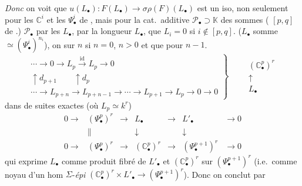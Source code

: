 \documentclass[11pt,a4paper]{article}
\begin{document}
\emph{Donc} on voit que $u(L_{\bullet}) : F(L_{\bullet}) \to \sigma\rho(F)(L_{\bullet})$
est un iso, non seulement pour les $\mathbb{C}^i$ et les $\Psi^i_{\bullet}$ de \ill{}, mais
pour  la cat.\ additive $\mathcal{P}_{\bullet} \supset \mathbb{K}$ des sommes
 (   
 \struck{\ill{}} $[p, q]$ de .) $\mathcal{P}_{\bullet}$
 par les $L_{\bullet}$, par la longueur  $L_{\bullet}$,
 que $L_i = 0$ si $i \notin [p, q]$. ($L_{\bullet}$ somme
$\simeq (\Psi^i_{\bullet})^{n_i}$), on   sur $n$ si
$n = 0$, \ill{} \ill{} $n > 0$ et  \ill{} que \ill{}  pour $n - 1$.
\[
\left.
\begin{array}{c}
\cdots \to 0 \to L_p \xrightarrow{\ \mathrm{id}\ } L_p \to 0 \\
\uparrow{\scriptstyle d_{p+1}} \qquad \uparrow{\scriptstyle d_p} \\
\cdots \to L_{p+n} \to L_{p+n-1} \to \cdots \to L_{p+1} \to L_p \to 0 \to 0
\end{array}
\right\rbrace
\qquad
\begin{array}{c}
(\mathbb{C}^{p}_{\bullet})^{r} \\
\uparrow \\
L_{\bullet}
\end{array}
\]
\ill{} dans \ill{} \ill{} de suites exactes (où $L_p \simeq k^r$)
\[
\begin{array}{ccccccccc}
0 \to & (\Psi^p_{\bullet})^r & \to & L_{\bullet} & \longrightarrow & L'_{\bullet} & \to 0 \\
& \| & & \downarrow & & \downarrow & \\
0 \to & (\Psi^p_{\bullet})^r & \to & (\mathbb{C}^p_{\bullet})^r & \longrightarrow & (\Psi^{p+1}_{\bullet})^r & \to 0
\end{array}
\]
qui exprime $L_{\bullet}$ comme produit fibré de $L'_{\bullet}$ et $(\mathbb{C}^p_{\bullet})^r$ sur
$(\Psi^{p+1}_{\bullet})^r$ (i.e.\ comme noyau d'un hom \struck{\ill{}} $\Sigma$-\emph{épi}
$(\mathbb{C}^p_{\bullet})^r \times L'_{\bullet} \to (\Psi^{p+1}_{\bullet})^r$). Donc on conclut par
\end{document}
